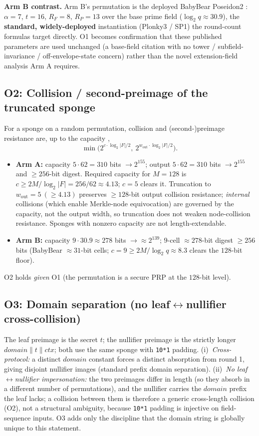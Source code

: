 \documentclass[11pt]{article}
\newcommand{\cat}{\mathbin{\|}}          %
\newcommand{\wout}{w_{\mathrm{out}}}
\theoremstyle{plain}
\theoremstyle{definition}
\begin{document}
\textbf{Arm B contrast.} Arm B's permutation is the deployed BabyBear Poseidon2 \cite{GKS23,Plonky3}:
$\alpha = 7$, $t = 16$, $R_F = 8$, $R_P = 13$ over the base prime field ($\log_2 q \approx 30.9$),
the \textbf{standard, widely-deployed} instantiation (Plonky3 / SP1) the round-count formulas target
directly. O1 becomes confirmation that these published parameters are used unchanged (a base-field
citation with no tower / subfield-invariance / off-envelope-state concern) rather than the novel
extension-field analysis Arm A requires.

\subsection*{O2: Collision / second-preimage of the truncated sponge}

For a sponge on a random permutation, collision and (second-)preimage resistance are, up to the
capacity \cite{BDPV08},
\[
\min\!\big(2^{c \cdot \log_2|F| / 2},\ 2^{\wout \cdot \log_2|F| / 2}\big).
\]
\begin{itemize}[leftmargin=*]
\item \textbf{Arm A:} capacity $5 \cdot 62 = 310$ bits $\to 2^{155}$; output $5 \cdot 62 = 310$ bits
  $\to 2^{155}$ and $\geq 256$-bit digest. Required capacity for $M = 128$ is
  $c \geq 2M / \log_2|F| = 256/62 \approx 4.13$; $c = 5$ clears it. Truncation to
  $\wout = 5\ (\geq 4.13)$ preserves $\geq 128$-bit output collision resistance; \emph{internal}
  collisions (which enable Merkle-node equivocation) are governed by the capacity, not the output
  width, so truncation does not weaken node-collision resistance. Sponges with nonzero capacity are
  not length-extendable.
\item \textbf{Arm B:} capacity $9 \cdot 30.9 \approx 278$ bits $\to \approx 2^{139}$; $9$-cell
  $\approx 278$-bit digest $\geq 256$ bits (BabyBear $\approx 31$-bit cells; $c = 9 \geq
  2M / \log_2 q \approx 8.3$ clears the $128$-bit floor).
\end{itemize}
O2 holds \emph{given} O1 (the permutation is a secure PRP at the $128$-bit level).

\subsection*{O3: Domain separation (no leaf\texorpdfstring{$\leftrightarrow$}{<->}nullifier cross-collision)}

The leaf preimage is the secret $t$; the nullifier preimage is the strictly longer
$\mathit{domain} \cat t \cat \mathit{ctx}$; both use the same sponge with \texttt{10*1} padding.
(i)~\emph{Cross-protocol:} a distinct $\mathit{domain}$ constant forces a distinct absorption from
round 1, giving disjoint nullifier images (standard prefix domain separation). (ii)~\emph{No
leaf$\leftrightarrow$nullifier impersonation:} the two preimages differ in length (so they absorb in
a different number of permutations), and the nullifier carries the $\mathit{domain}$ prefix the leaf
lacks; a collision between them is therefore a generic cross-length collision (O2), not a structural
ambiguity, because \texttt{10*1} padding is injective on field-sequence inputs. O3 adds only the
discipline that the domain string is globally unique to this statement.
\end{document}
